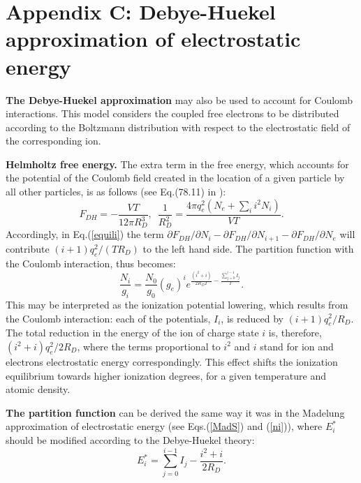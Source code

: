 \section{Appendix C: Debye-Huekel approximation of electrostatic energy}
{\bf The Debye-Huekel approximation} may also be used to account for Coulomb interactions.
This model considers the coupled free electrons to be distributed according to
the Boltzmann distribution with respect to the electrostatic field of the corresponding ion.

{\bf Helmholtz free energy.} The extra term in the free energy, which accounts for the
potential of the Coulomb field created in the location of a given particle
by all other particles, is as follows (see Eq.(78.11) in \cite{ll}):
\begin{equation}\label{DH}
F_{DH}=-\frac{VT}{12\pi R_D^3},\,\,\,\frac1{R_D^2} = \frac{4\pi q_e^2(N_e+\sum_i{i^2N_i})}{VT}.
\end{equation}
Accordingly, in Eq.(\ref{equili}) the term $\partial F_{DH}/\partial N_i -\partial F_{DH}/\partial N_{i+1}-\partial F_{DH}/\partial N_e$ will 
contribute $(i+1)q^2_e/(TR_D)$ to the left hand side. The partition function with the Coulomb interaction, thus becomes:
\begin{equation}\label{pfDH}
\frac{N_{i}}{g_{i}}=\frac{N_0}{g_0}(g_e)^ie^{\frac{(i^2+i)}{2R_DT}-\frac{\sum_{j=0}^{i-1}I_j}T}.
\end{equation}
This may be interpreted as the ionization potential lowering, which results from the Coulomb interaction: each of the potentials, $I_i$, is reduced
by $(i+1)q_e^2/R_D$. The total reduction in the energy of the ion of charge state $i$ is, therefore, $(i^2+i)q_e^2/2R_D$, where the terms
proportional to $i^2$ and $i$ 
stand for ion and electrons electrostatic energy correspondingly. This effect shifts the ionization equilibrium towards higher ionization degrees, for a given 
temperature and atomic density. 

{\bf The partition function} can be derived the same way it was in the Madelung approximation of electrostatic energy
(see Eqs.(\ref{MadS}) and (\ref{ni})), where $E^*_i$ should be modified according to the Debye-Huekel theory:
\begin{equation}
E^*_i = \sum_{j=0}^{i-1}{I_j} - \frac{i^2+i}{2 R_D}.
\end{equation}

